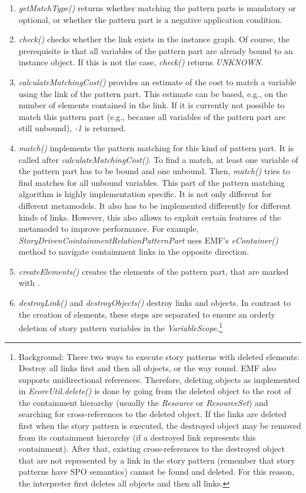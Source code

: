 \begin{enumerate}
	\item \emph{getMatchType()} returns whether matching the pattern parts is mandatory or optional, or whether the pattern part is a negative application condition. 
	
	\item \emph{check()} checks whether the link exists in the instance graph. Of course, the prerequisite is that all variables of the pattern part are already bound to an instance object. If this is not the case, \emph{check()} returns \emph{UNKNOWN}. 

	\item \emph{calculateMatchingCost()} provides an estimate of the cost to match a variable using the link of the pattern part. This estimate can be based, e.g., on the number of elements contained in the link. If it is currently not possible to match this pattern part (e.g., because all variables of the pattern part are still unbound), \emph{-1} is returned.

	\item \emph{match()} implements the pattern matching for this kind of pattern part. It is called after \emph{calculateMatchingCost()}. To find a match, at least one variable of the pattern part has to be bound and one unbound. Then, \emph{match()} tries to find matches for all unbound variables. This part of the pattern matching algorithm is highly implementation specific. It is not only different for different metamodels. It also has to be implemented differently for different kinds of links. However, this also allows to exploit certain features of the metamodel to improve performance. For example, \emph{StoryDrivenCointainmentRelationPatternPart} uses EMF's \emph{eContainer()} method to navigate containment links in the opposite direction.	
	
	\item \emph{createElements()} creates the elements of the pattern part, that are marked with \create.
	
	\item \emph{destroyLink()} and \emph{destroyObjects()} destroy links and objects. In contrast to the creation of elements, these steps are separated to ensure an orderly deletion of story pattern variables in the \emph{VariableScope}.\footnote{Background: There two ways to execute story patterns with deleted elements: Destroy all links first and then all objects, or the way round. EMF also supports unidirectional references. Therefore, deleting objects as implemented in \emph{EcoreUtil.delete()} is done by going from the deleted object to the root of the containment hierarchy (usually the \emph{Resource} or \emph{ResourceSet}) and searching for cross-references to the deleted object. If the links are deleted first when the story pattern is executed, the destroyed object may be removed from its containment hierarchy (if a destroyed link represents this containment). After that, existing cross-references to the destroyed object that are not represented by a link in the story pattern (remember that story patterns have SPO semantics) cannot be found and deleted. For this reason, the interpreter first deletes all objects and then all links.}
	


\end{enumerate}
